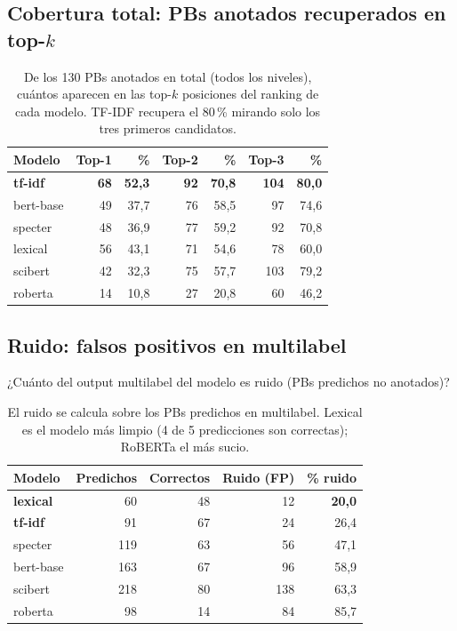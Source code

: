 \documentclass[11pt,a4paper]{article}
\newcommand{\good}[1]{\textbf{\textcolor{accent}{#1}}}
\begin{document}
\subsection{Cobertura total: PBs anotados recuperados en top-$k$}

\begin{table}[h]
\centering
\small
\begin{tabular}{lrrrrrr}
\toprule
\textbf{Modelo} & \textbf{Top-1} & \% & \textbf{Top-2} & \% & \textbf{Top-3} & \% \\
\midrule
\good{tf-idf} & \good{68} & \good{52{,}3} & \good{92} & \good{70{,}8} & \good{104} & \good{80{,}0} \\
bert-base & 49 & 37{,}7 & 76 & 58{,}5 & 97 & 74{,}6 \\
specter & 48 & 36{,}9 & 77 & 59{,}2 & 92 & 70{,}8 \\
lexical & 56 & 43{,}1 & 71 & 54{,}6 & 78 & 60{,}0 \\
scibert & 42 & 32{,}3 & 75 & 57{,}7 & 103 & 79{,}2 \\
roberta & 14 & 10{,}8 & 27 & 20{,}8 & 60 & 46{,}2 \\
\bottomrule
\end{tabular}
\caption{De los 130 PBs anotados en total (todos los niveles), cuántos aparecen en las top-$k$ posiciones del ranking de cada modelo. TF-IDF recupera el 80\,\% mirando solo los tres primeros candidatos.}
\label{tab:cobertura}
\end{table}

\subsection{Ruido: falsos positivos en multilabel}

¿Cuánto del output multilabel del modelo es ruido (PBs predichos no anotados)?

\begin{table}[h]
\centering
\small
\begin{tabular}{lrrrr}
\toprule
\textbf{Modelo} & \textbf{Predichos} & \textbf{Correctos} & \textbf{Ruido (FP)} & \textbf{\% ruido} \\
\midrule
\good{lexical} & 60 & 48 & 12 & \good{20{,}0} \\
\good{tf-idf} & 91 & 67 & 24 & 26{,}4 \\
specter & 119 & 63 & 56 & 47{,}1 \\
bert-base & 163 & 67 & 96 & 58{,}9 \\
scibert & 218 & 80 & 138 & 63{,}3 \\
roberta & 98 & 14 & 84 & 85{,}7 \\
\bottomrule
\end{tabular}
\caption{El ruido se calcula sobre los PBs predichos en multilabel. Lexical es el modelo más limpio (4 de 5 predicciones son correctas); RoBERTa el más sucio.}
\label{tab:ruido}
\end{table}
\end{document}
